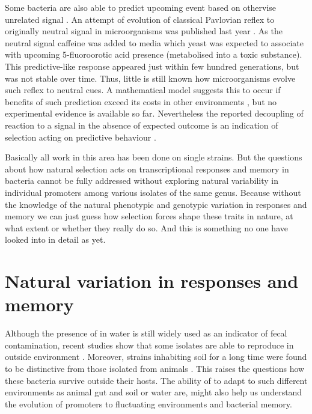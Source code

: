 Some bacteria are also able to predict upcoming event based on othervise unrelated signal \cite{kondo1993circadian, min2005rhythmic, tagkopoulos2008predictive, mitchell2009adaptive}.
An attempt of evolution of classical Pavlovian reflex to originally neutral signal in microorganisms was published last year \cite{lopez2017adaptive}.
As the neutral signal caffeine was added to media which yeast  was expected to associate with upcoming 5-fluoroorotic acid presence (metabolised into a toxic substance).
This predictive-like response appeared just within few hundred generations, but was not stable over time.
Thus, little is still known how microorganisms evolve such reflex to neutral cues.
A mathematical model suggests this to occur if benefits of such prediction exceed its costs in other environments \cite{mitchell2011mathematical}, but no experimental evidence is available so far.
Nevertheless the reported decoupling of reaction to a signal in the absence of expected outcome is an indication of selection acting on predictive behaviour \cite{tagkopoulos2008predictive, mitchell2009adaptive}.

Basically all work in this area has been done on single strains.
But the questions about how natural selection acts on transcriptional responses and memory in bacteria cannot be fully addressed without exploring natural variability in individual promoters among various isolates of the same genus.
Because without the knowledge of the natural phenotypic and genotypic variation in responses and memory we can just guess how selection forces shape these traits in nature, at what extent or whether they really do so.
And this is something no one have looked into in detail as yet.


\section{Natural variation in responses and memory}
Although the presence of  in water is still widely used as an indicator of fecal contamination, recent studies show that some  isolates are able to  reproduce in outside environment \cite{byappanahalli2004indigenous, somorin2016general}.
Moreover, strains inhabiting soil for a long time were found to be distinctive from those isolated from animals \cite{walk2009cryptic, walk2015cryptic}.
This raises the questions how these bacteria survive outside their hosts.
The ability of  to adapt to such different environments as animal gut and soil or water are, might also help us understand the evolution of promoters to fluctuating environments and bacterial memory.

